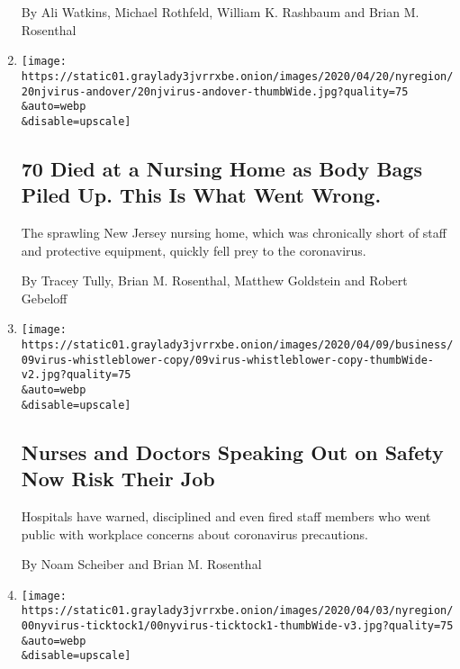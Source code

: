 \begin{enumerate}
  By Ali Watkins, Michael Rothfeld, William K. Rashbaum and Brian M.
  Rosenthal
\item
  \href{/2020/04/19/nyregion/coronavirus-nj-andover-nursing-home-deaths.html}{}

  \texttt{[image: https://static01.graylady3jvrrxbe.onion/images/2020/04/20/nyregion/20njvirus-andover/20njvirus-andover-thumbWide.jpg?quality=75\\\&auto=webp\\\&disable=upscale]}

  \hypertarget{70-died-at-a-nursing-home-as-body-bags-piled-up-this-is-what-went-wrong}{%
  \subsection{70 Died at a Nursing Home as Body Bags Piled Up. This Is
  What Went
  Wrong.}\label{70-died-at-a-nursing-home-as-body-bags-piled-up-this-is-what-went-wrong}}

  The sprawling New Jersey nursing home, which was chronically short of
  staff and protective equipment, quickly fell prey to the coronavirus.

  By Tracey Tully, Brian M. Rosenthal, Matthew Goldstein and Robert
  Gebeloff
\item
  \href{/2020/04/09/business/coronavirus-health-workers-speak-out.html}{}

  \texttt{[image: https://static01.graylady3jvrrxbe.onion/images/2020/04/09/business/09virus-whistleblower-copy/09virus-whistleblower-copy-thumbWide-v2.jpg?quality=75\\\&auto=webp\\\&disable=upscale]}

  \hypertarget{nurses-and-doctors-speaking-out-on-safety-now-risk-their-job}{%
  \subsection{Nurses and Doctors Speaking Out on Safety Now Risk Their
  Job}\label{nurses-and-doctors-speaking-out-on-safety-now-risk-their-job}}

  Hospitals have warned, disciplined and even fired staff members who
  went public with workplace concerns about coronavirus precautions.

  By Noam Scheiber and Brian M. Rosenthal
\item
  \href{/2020/04/08/nyregion/new-york-coronavirus-response-delays.html}{}

  \texttt{[image: https://static01.graylady3jvrrxbe.onion/images/2020/04/03/nyregion/00nyvirus-ticktock1/00nyvirus-ticktock1-thumbWide-v3.jpg?quality=75\\\&auto=webp\\\&disable=upscale]}


\end{enumerate}
